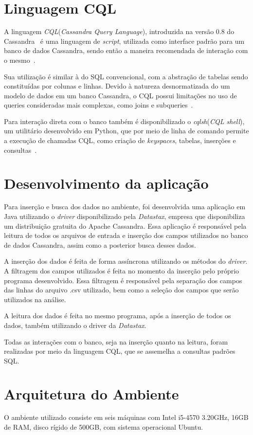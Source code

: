 \section{Linguagem CQL}
A linguagem \emph{CQL}(\emph{Cassandra Query Language}), introduzida na versão 0.8 do Cassandra~\cite{cassandra08} é uma linguagem de \emph{script}, utilizada como interface padrão para um banco de dados Cassandra, sendo então a maneira recomendada de interação com o mesmo~\cite{cassandracql}. 

Sua utilização é similar à do SQL convencional, com a abstração de tabelas sendo constituídas por colunas e linhas. Devido à natureza desnormatizada do um modelo de dados em um banco Cassandra, o CQL possui limitações no uso de queries consideradas mais complexas, como joins e subqueries~\cite{cassandracql}.

Para interação direta com o banco também é disponibilizado o \emph{cqlsh}(\emph{CQL shell}), um utilitário desenvolvido em Python, que por meio de linha de comando permite a execução de chamadas CQL, como criação de \emph{keyspaces}, tabelas, inserções e consultas~\cite{cassandra_intro_cql}.

\section{Desenvolvimento da aplicação}
Para inserção e busca dos dados no ambiente, foi desenvolvida uma aplicação em Java utilizando o \emph{driver} disponibilizado pela \emph{Datastax}, empresa que disponibiliza um distribuição gratuita do Apache Cassandra. Essa aplicação é responsável pela leitura de todos os arquivos de entrada e inserção dos campos utilizados no banco de dados Cassandra, assim como a posterior busca desses dados.

A inserção dos dados é feita de forma assíncrona utilizando os métodos do \emph{driver}. A filtragem dos campos utilizados é feita no momento da inserção pelo próprio programa desenvolvido. Essa filtragem é responsável pela separação dos campos das linhas do arquivo .csv utilizado, bem como a seleção dos campos que serão utilizados na análise.

A leitura dos dados é feita no mesmo programa, após a inserção de todos os dados, também utilizando o driver da \emph{Datastax}.

Todas as interações com o banco, seja na inserção quanto na leitura, foram realizadas por meio da linguagem CQL, que se assemelha a consultas padrões SQL.

\section{Arquitetura do Ambiente}
O ambiente utilizado consiste em seis máquinas com Intel i5-4570 3.20GHz, 16GB de RAM, disco rígido de 500GB, com sistema operacional Ubuntu.

